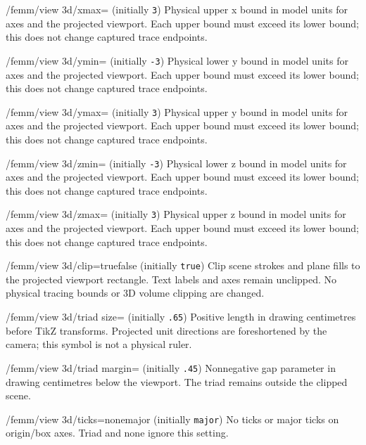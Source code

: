 \begin{key}{/femm/view 3d/xmax= (initially \texttt{3})}
Physical upper x bound in model units for axes and the projected viewport. Each upper bound must exceed its lower bound; this does not change captured trace endpoints.
\end{key}
\begin{key}{/femm/view 3d/ymin= (initially \texttt{-3})}
Physical lower y bound in model units for axes and the projected viewport. Each upper bound must exceed its lower bound; this does not change captured trace endpoints.
\end{key}
\begin{key}{/femm/view 3d/ymax= (initially \texttt{3})}
Physical upper y bound in model units for axes and the projected viewport. Each upper bound must exceed its lower bound; this does not change captured trace endpoints.
\end{key}
\begin{key}{/femm/view 3d/zmin= (initially \texttt{-3})}
Physical lower z bound in model units for axes and the projected viewport. Each upper bound must exceed its lower bound; this does not change captured trace endpoints.
\end{key}
\begin{key}{/femm/view 3d/zmax= (initially \texttt{3})}
Physical upper z bound in model units for axes and the projected viewport. Each upper bound must exceed its lower bound; this does not change captured trace endpoints.
\end{key}
\begin{key}{/femm/view 3d/clip=true\textbar false (initially \texttt{true})}
Clip scene strokes and plane fills to the projected viewport rectangle. Text labels and axes remain unclipped. No physical tracing bounds or 3D volume clipping are changed.
\end{key}
\begin{key}{/femm/view 3d/triad size= (initially \texttt{.65})}
Positive length in drawing centimetres before TikZ transforms. Projected unit directions are foreshortened by the camera; this symbol is not a physical ruler.
\end{key}
\begin{key}{/femm/view 3d/triad margin= (initially \texttt{.45})}
Nonnegative gap parameter in drawing centimetres below the viewport. The triad remains outside the clipped scene.
\end{key}
\begin{key}{/femm/view 3d/ticks=none\textbar major (initially \texttt{major})}
No ticks or major ticks on origin/box axes. Triad and none ignore this setting.
\end{key}
